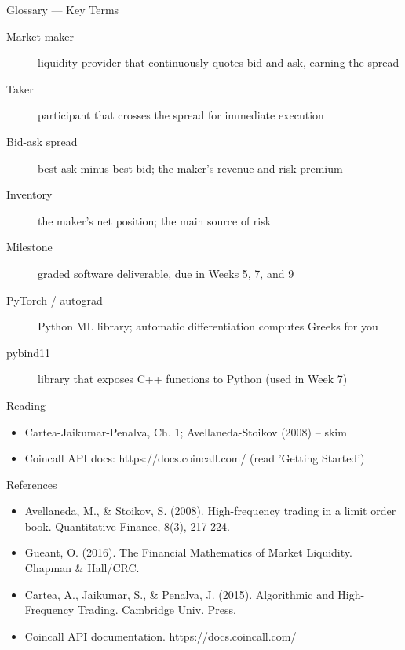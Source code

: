 \documentclass[aspectratio=169,10pt]{beamer}
\begin{document}
\begin{frame}{Glossary --- Key Terms}
\footnotesize\begin{description}
\item[\color{ncsured}Market maker] liquidity provider that continuously quotes bid and ask, earning the spread
\item[\color{ncsured}Taker] participant that crosses the spread for immediate execution
\item[\color{ncsured}Bid-ask spread] best ask minus best bid; the maker's revenue and risk premium
\item[\color{ncsured}Inventory] the maker's net position; the main source of risk
\item[\color{ncsured}Milestone] graded software deliverable, due in Weeks 5, 7, and 9
\item[\color{ncsured}PyTorch / autograd] Python ML library; automatic differentiation computes Greeks for you
\item[\color{ncsured}pybind11] library that exposes C++ functions to Python (used in Week 7)
\end{description}
\end{frame}

\begin{frame}{Reading}
\begin{itemize}
  \item Cartea-Jaikumar-Penalva, Ch. 1; Avellaneda-Stoikov (2008) -- skim
  \item Coincall API docs: https://docs.coincall.com/  (read 'Getting Started')
\end{itemize}
\end{frame}

\begin{frame}{References}
\scriptsize\begin{itemize}\setlength{\itemsep}{3pt}
  \item Avellaneda, M., \& Stoikov, S. (2008). High-frequency trading in a limit order book. Quantitative Finance, 8(3), 217-224.
  \item Gueant, O. (2016). The Financial Mathematics of Market Liquidity. Chapman \& Hall/CRC.
  \item Cartea, A., Jaikumar, S., \& Penalva, J. (2015). Algorithmic and High-Frequency Trading. Cambridge Univ. Press.
  \item Coincall API documentation. https://docs.coincall.com/
\end{itemize}
\end{frame}
\end{document}
